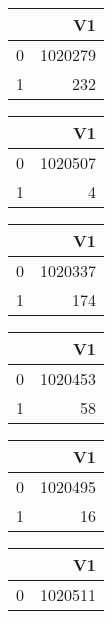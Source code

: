 \bigskip\bigskip
\centering
\begin{tabular}{rr}
  \hline
 & V1 \\ 
  \hline
0 & 1020279 \\ 
  1 & 232 \\ 
   \hline
\end{tabular}

\bigskip\bigskip
\centering
\begin{tabular}{rr}
  \hline
 & V1 \\ 
  \hline
0 & 1020507 \\ 
  1 &   4 \\ 
   \hline
\end{tabular}

\bigskip\bigskip
\centering
\begin{tabular}{rr}
  \hline
 & V1 \\ 
  \hline
0 & 1020337 \\ 
  1 & 174 \\ 
   \hline
\end{tabular}

\bigskip\bigskip
\centering
\begin{tabular}{rr}
  \hline
 & V1 \\ 
  \hline
0 & 1020453 \\ 
  1 &  58 \\ 
   \hline
\end{tabular}

\bigskip\bigskip
\centering
\begin{tabular}{rr}
  \hline
 & V1 \\ 
  \hline
0 & 1020495 \\ 
  1 &  16 \\ 
   \hline
\end{tabular}

\bigskip\bigskip
\centering
\begin{tabular}{rr}
  \hline
 & V1 \\ 
  \hline
0 & 1020511 \\ 
   \hline
\end{tabular}

